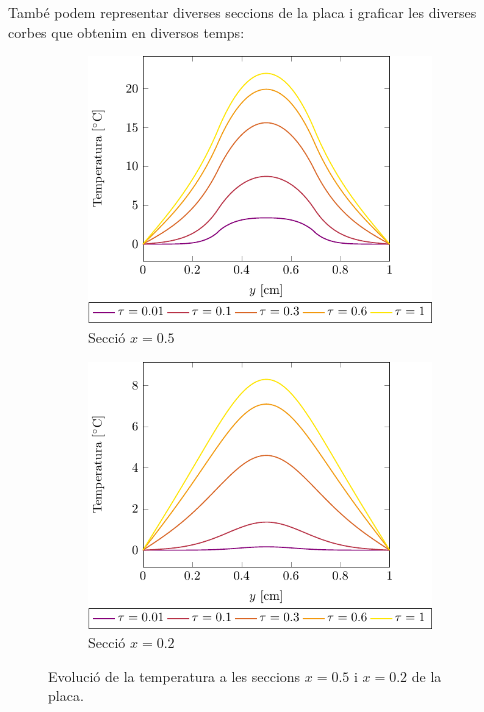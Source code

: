 \documentclass[10pt,a4paper]{article}
\theoremstyle{definition}
\theoremstyle{remark}
\begin{document}
També podem representar diverses seccions de la placa i graficar les diverses corbes que obtenim en diversos temps:

\begin{figure}[t!]
  \centering
  \begin{subfigure}{0.49\linewidth}
    \centering
    \includegraphics[width=\linewidth]{Images/graphic50.pdf}
    \caption{Secció $x=0.5$}
  \end{subfigure}\hfill
  \begin{subfigure}{0.49\linewidth}
    \centering
    \includegraphics[width=\linewidth]{Images/graphic20.pdf}
    \caption{Secció $x=0.2$}
  \end{subfigure}
  \caption{Evolució de la temperatura a les seccions $x=0.5$ i $x=0.2$ de la placa.}
\end{figure}
\end{document}
